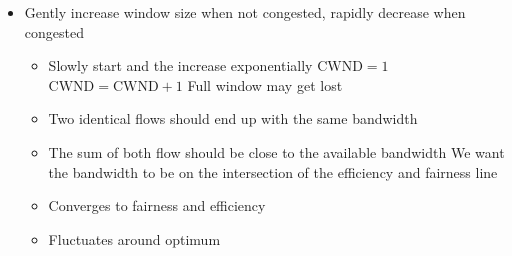 \begin{itemize}
\begin{itemize}
\begin{itemize}
                \end{itemize}
        \end{itemize}
        \begin{itemize}
            \item Gently increase window size when not congested, rapidly decrease when congested
                \begin{itemize}
                     Get a quick estimate of the available bandwidth
                    \item Slowly start and the increase exponentially
                     $\text{CWND} = 1$
                     $\text{CWND} = \text{CWND} + 1$
                    \icon Full window may get lost
                \end{itemize}
                \begin{itemize}
                    \item Two identical flows should end up with the same bandwidth
                    \item The sum of both flow should be close to the available bandwidth
                         We want the bandwidth to be on the intersection of the efficiency and fairness line
                \end{itemize}
                \begin{itemize}
                     Add a constant to the point
                        \begin{itemize}
                            \item $(x, y) \to (\alpha + x, \alpha + y)$
                            \item In TCP $\alpha = 1 / \text{CWND}$
                            \item $\implies$ Increment at most by $1$ per RTT
                        \end{itemize}
                     Take a fraction of the point
                        \begin{itemize}
                            \item In TCP set $\text{CWND} = 1$
                        \end{itemize}
                    \item Converges to fairness and efficiency
                    \item Fluctuates around optimum

\end{itemize}
\end{itemize}
\end{itemize}
